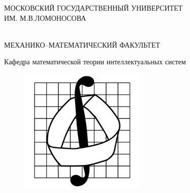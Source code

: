 


\begin{titlepage}

\large \thispagestyle{empty} \phantom{.}\vspace{2mm} \large
\thispagestyle{empty}

\begin{center}
МОСКОВСКИЙ ГОСУДАРСТВЕННЫЙ УНИВЕРСИТЕТ\\
ИМ. М.В.ЛОМОНОСОВА\\
\noindent\

\vspace{0.3cm}

\vspace{-0.8cm}
МЕХАНИКО--МАТЕМАТИЧЕСКИЙ ФАКУЛЬТЕТ\\

\vspace{0.8cm}



\end{center}
\newline
\begin{center}
Кафедра математической теории интеллектуальных систем
\end{center}


\begin{figure}[htbp] %

\begin{center}

\includegraphics[width=6cm]{mmlogo1}


\end{center}
\end{figure}
\end{titlepage}
